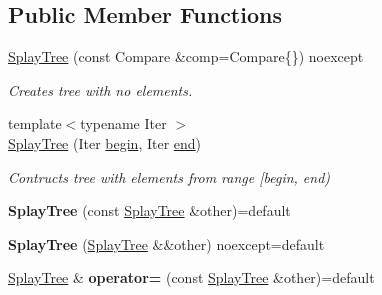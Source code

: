 \subsection*{Public Member Functions}
\begin{DoxyCompactItemize}
\item 
\mbox{\label{classlab_1_1forest_1_1SplayTree_ad174966dcd61b790db0ca1f58e830385}} 
\hyperlink{classlab_1_1forest_1_1SplayTree_ad174966dcd61b790db0ca1f58e830385}{Splay\+Tree} (const Compare \&comp=Compare\{\}) noexcept
\begin{DoxyCompactList}\small\item\em Creates tree with no elements. \end{DoxyCompactList}\item 
\mbox{\label{classlab_1_1forest_1_1SplayTree_aaa4d86c652110bde313d44c614620a83}} 
{\footnotesize template$<$typename Iter $>$ }\\\hyperlink{classlab_1_1forest_1_1SplayTree_aaa4d86c652110bde313d44c614620a83}{Splay\+Tree} (Iter \hyperlink{classlab_1_1forest_1_1detail_1_1BSTBase_aee57d4461130971ad187ea41bc8e4e74}{begin}, Iter \hyperlink{classlab_1_1forest_1_1detail_1_1BSTBase_ad2ea364cc61d5581a861d1aab3734129}{end})
\begin{DoxyCompactList}\small\item\em Contructs tree with elements from range \mbox{[}begin, end) \end{DoxyCompactList}\item 
\mbox{\label{classlab_1_1forest_1_1SplayTree_aea9bae39a4f74dbc5b58aa597310e119}} 
{\bfseries Splay\+Tree} (const \hyperlink{classlab_1_1forest_1_1SplayTree}{Splay\+Tree} \&other)=default
\item 
\mbox{\label{classlab_1_1forest_1_1SplayTree_a0e734b8ca1882575349e3b415a91d58d}} 
{\bfseries Splay\+Tree} (\hyperlink{classlab_1_1forest_1_1SplayTree}{Splay\+Tree} \&\&other) noexcept=default
\item 
\mbox{\label{classlab_1_1forest_1_1SplayTree_a94b9c8173af74fa3e16cc64734512c56}} 
\hyperlink{classlab_1_1forest_1_1SplayTree}{Splay\+Tree} \& {\bfseries operator=} (const \hyperlink{classlab_1_1forest_1_1SplayTree}{Splay\+Tree} \&other)=default

\end{DoxyCompactItemize}
